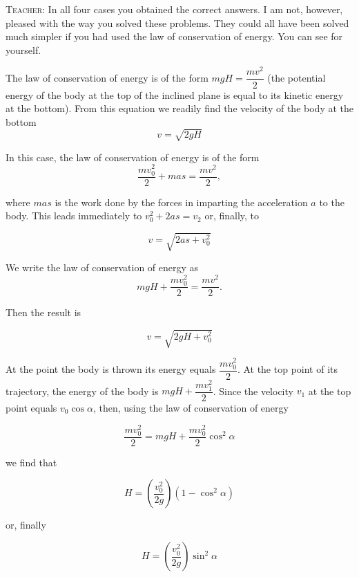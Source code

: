 \documentclass[a4paper,sfsidenotes]{tufte-book}
\begin{document}
\textsc{Teacher:} In all four cases you obtained the correct answers. I am not, however, pleased with the way you solved these problems. They could all have been solved much simpler if you had used the law of conservation of energy. You can see for yourself. 
\begin{description}[leftmargin=1cm, style=nextline]

\item[First problem.] The law of conservation of energy is of the form $mgH = \dfrac{mv^{2}}{2}$ (the potential energy of the body at the top of the inclined plane is equal to its kinetic energy at the bottom). From this equation we readily find the velocity of the body at the bottom
\begin{equation*}
v = \sqrt{2gH}
\end{equation*}


\item[Second problem.] In this case, the law of conservation of energy is of the form 
\begin{equation*}
\frac{mv_{0}^{2}}{2}+mas= \frac{mv^{2}}{2}, 
\end{equation*}

where $mas$ is the work done by the forces in imparting the acceleration $a$ to the body. This leads immediately to $v_{0}^{2} + 2as = v_{2}$ or, finally, to 

\begin{equation*}
v=\sqrt{2as+v_{0}^{2}}
\end{equation*}

\item[Third problem.] We write the law of conservation of energy as 
\begin{equation*}
mgH+\frac{mv_{0}^{2}}{2}= \frac{mv^{2}}{2}.
\end{equation*}

Then the result is

\begin{equation*}
v=\sqrt{2gH+v_{0}^{2}}
\end{equation*}

\item[Fourth problem.] At the point the body is thrown its energy equals $\dfrac{mv_{0}^{2}}{2}$. At the top point of its trajectory, the energy of the body is $mgH+\dfrac{mv_{1}^{2}}{2}$. Since the velocity $v_{1}$ at the top point equals $v_{0} \cos \alpha$, then, using the law of conservation of energy

\begin{equation*}
\frac{mv_{0}^{2}}{2} = mgH + \frac{mv_{0}^{2}}{2} \cos^{2} \alpha
\end{equation*}

we find that

\begin{equation*}
H=\left(\frac{v_{0}^{2}}{2g} \right) \left( 1 - \cos^{2} \alpha \right)
\end{equation*}

or, finally

\begin{equation*}
H=\left(\frac{v_{0}^{2}}{2g} \right) \sin^{2} \alpha 
\end{equation*}

\end{description}
\end{document}
